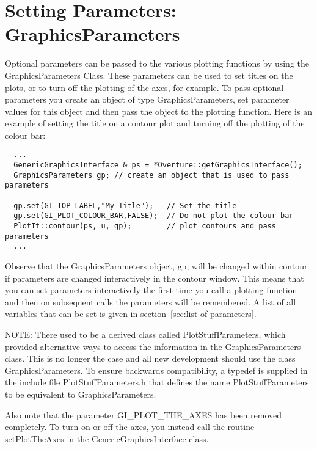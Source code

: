 \documentclass{article}
\newcommand{\Index}[1]{#1\index{#1}}
\begin{document}
\vfill\eject
\section{Setting Parameters: \Index{GraphicsParameters}} 
\label{sec:GraphicsParameters}

Optional parameters can be passed to the various plotting functions by
using the GraphicsParameters Class. These parameters can be used to
set titles on the plots, or to turn off the plotting of the axes, for
example. To pass optional parameters you create an object of type
GraphicsParameters, set parameter values for this object and then pass
the object to the plotting function.  Here is an example of setting
the title on a contour plot and turning off the plotting of the colour
bar:

%
{\footnotesize\begin{verbatim}
  ...
  GenericGraphicsInterface & ps = *Overture::getGraphicsInterface(); 
  GraphicsParameters gp; // create an object that is used to pass parameters

  gp.set(GI_TOP_LABEL,"My Title");   // Set the title
  gp.set(GI_PLOT_COLOUR_BAR,FALSE);  // Do not plot the colour bar
  PlotIt::contour(ps, u, gp);        // plot contours and pass parameters
  ...
\end{verbatim}
}
%
Observe that the GraphicsParameters object, {\ff gp}, will be changed within {\ff contour}
if parameters are changed interactively in the contour window.  This means that you can
set parameters interactively the first time you call a plotting function and then on
subsequent calls the parameters will be remembered. A list of all variables that can be
set is given in section~\protect\ref{sec:list-of-parameters}.

NOTE: There used to be a derived class called PlotStuffParameters,
which provided alternative ways to access the information in the
GraphicsParameters class. This is no longer the case and all new
development should use the class GraphicsParameters. To ensure
backwards compatibility, a typedef is supplied in the include file
PlotStuffParameters.h that defines the name PlotStuffParameters to be
equivalent to GraphicsParameters.

Also note that the parameter GI\_PLOT\_THE\_AXES has been removed
completely. To turn on or off the axes, you instead call the routine
setPlotTheAxes in the GenericGraphicsInterface class.
\end{document}
